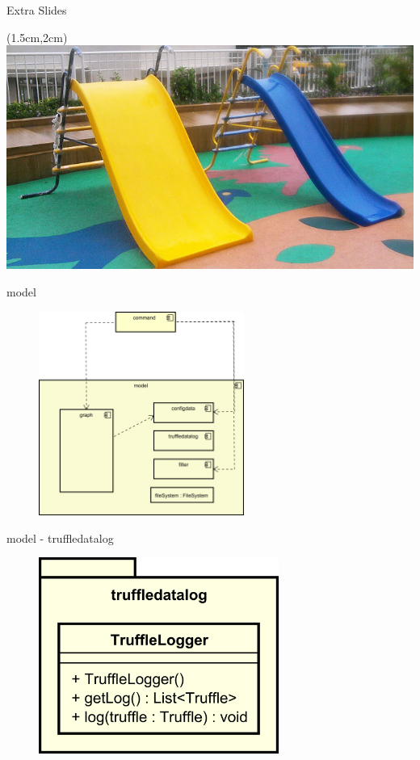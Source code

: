 \begin{frame}{Extra Slides}
 \begin{textblock*}{5cm}(1.5cm,2cm)
  \includegraphics[scale=0.4]{./images/slides.jpg}
 \end{textblock*}
\end{frame}

 \begin{frame}{model}
   \begin{figure}
     \centering
     \includegraphics[width=0.6\textwidth]{./images/model.png}
   \end{figure}
 \end{frame}

\begin{frame}{model - truffledatalog}
  \begin{figure}
    \centering
    \includegraphics[width=0.7\textwidth]{./images/truffledatalog.png}
  \end{figure}
\end{frame}

